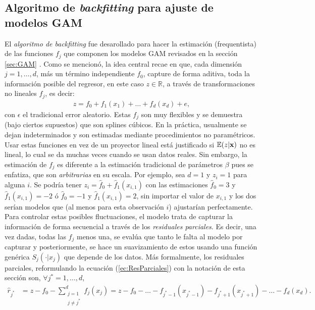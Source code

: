 \documentclass[../Main/Main.tex]{subfiles}
\begin{document}
\subsection{Algoritmo de \textit{backfitting} para ajuste de modelos GAM} \label{sec:AlgoBackfitting}
El \textit{algoritmo de backfitting} fue desarollado para hacer la estimación (frequentista) de las funciones $f_j$ que componen los modelos GAM revisados en la sección \ref{sec:GAM} \autocite{hastie1986generalized}. Como se mencionó, la idea central recae en que, cada dimensión $j = 1,\ldots,d$, más un término independiente $f_0$, capture de forma aditiva, toda la información posible del regresor, en este caso $z\in\mathbb{R}$, a través de transformaciones no lineales $f_j$, es decir:  
\begin{align}
	z = f_0 + f_1(x_1) + \ldots + f_d(x_d) + e, \label{ec:GAM}
\end{align}
con $\epsilon$ el tradicional error aleatorio. Estas $f_j$ son muy flexibles y se demuestra (bajo ciertos supuestos) que son splines cúbicos. En la práctica, usualmente se dejan indeterminados y son estimadas mediante procedimientos no paramétricos. Usar estas funciones en vez de un proyector lineal está justificado si $\mathbb{E}(z|\mathbf{x})$ no es lineal, lo cual se da muchas veces cuando se usan datos reales. Sin embargo, la estimación de $f_j$ es diferente a la estimación tradicional de parámetros $\beta$ pues se enfatiza, que son \textit{arbitrarias} en su escala. Por ejemplo, sea $d = 1$ y $z_i = 1$ para alguna $i$. Se podría tener $z_i = \hat{f}_0 + \hat{f}_1(x_{i,1})$  con las estimaciones $\hat{f}_0 = 3$ y $\hat{f}_1(x_{i,1}) = -2$ ó $\hat{f}_0 = -1$ y $\hat{f}_1(x_{i,1}) = 2$, sin importar el valor de $x_{i,1}$ y los dos serían modelos que (al menos para esta observación $i$) ajustarían perfectamente. Para controlar estas posibles fluctuaciones, el modelo trata de capturar la información de forma secuencial a través de los \textit{residuales parciales}. Es decir, una vez dadas, todas las $f_j$ menos una, se evalúa que tanto le falta al modelo por capturar y posteriormente, se hace un suavizamiento de estos usando una función genérica $S_j(\cdot|x_j)$ que depende de los datos. Más formalmente, los residuales parciales, reformulando la ecuación (\ref{ec:ResParciales}) con la notación de esta sección son, $\forall j^*=1,\ldots,d$,
\begin{align}
	\hat{r}_{j^*} &= z - f_0 - \sum_{\substack{j=1\\ j \neq j^*}}^d f_j(x_j) = z - f_0 -  \ldots - f_{j^*-1}(x_{j^*-1}) - f_{j^*+1}(x_{j^*+1}) - \ldots - f_d(x_d).  \label{ec:ResParciales2}
\end{align}
\end{document}
